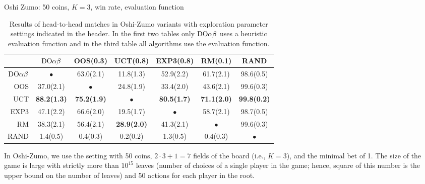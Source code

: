\begin{table}[t!]
\begin{scriptsize}
Oshi Zumo: 50 coins, $K=3$, win rate, evaluation function
\begin{tabular}{|r|cccccc|}\hline
&$\textrm{DO}\alpha\beta$&OOS(0.3)&UCT(0.8)&EXP3(0.8)&RM(0.1)&RAND\\\hline
$\textrm{DO}\alpha\beta$&$\bullet$&63.0(2.1)&11.8(1.3)&52.9(2.2)&61.7(2.1)&98.6(0.5)\\
OOS&37.0(2.1)&$\bullet$&24.8(1.9)&33.4(2.0)&43.6(2.1)&99.6(0.3)\\
UCT&\textbf{88.2(1.3)}&\textbf{75.2(1.9)}&$\bullet$&\textbf{80.5(1.7)}&\textbf{71.1(2.0)}&\textbf{99.8(0.2)}\\
EXP3&47.1(2.2)&66.6(2.0)&19.5(1.7)&$\bullet$&58.7(2.1)&98.7(0.5)\\
RM&38.3(2.1)&56.4(2.1)&\textbf{28.9(2.0)}&41.3(2.1)&$\bullet$&99.6(0.3)\\
RAND&1.4(0.5)&0.4(0.3)&0.2(0.2)&1.3(0.5)&0.4(0.3)&$\bullet$\\
\hline
\end{tabular}
\end{scriptsize}
\caption{Results of head-to-head matches in Oshi-Zumo variants with exploration parameter settings indicated in the header. In the first two tables only $\textrm{DO}\alpha\beta$ uses a heuristic evaluation function and in the third table all algorithms use the evaluation function.}\label{fig:matches:oz}
\end{table}

In Oshi-Zumo, we use the setting with 50 coins, $2\cdot 3 + 1 = 7$ fields of the board (i.e., $K=3$), and the minimal bet of 1.
The size of the game is large with strictly more than $10^{15}$ leaves (number of choices of a single player in the game; hence, square of this number is the upper bound on the number of leaves) and 50 actions for each player in the root.



